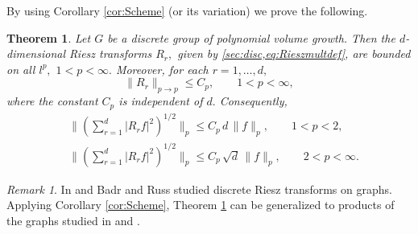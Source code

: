 \documentclass[leqno,12pt]{amsart}
\newtheorem{thm}{Theorem}[section]
\theoremstyle{definition}
\theoremstyle{remark}
\newtheorem*{remark}{Remark}
\begin{document}
By using Corollary \ref{cor:Scheme} (or its variation) we prove the following.
\begin{thm}
\label{thm:Rieszdiscgen}
Let $G$ be a discrete group of polynomial volume growth. Then the $d$-dimensional Riesz transforms $R_r,$ given by \eqref{sec:disc,eq:Rieszmultdef}, are bounded on all $l^p,$ $1<p<\infty.$ Moreover, for each $r=1,\ldots,d,$
\begin{equation}
\|R_r \|_{p\to p}\leq C_p ,\qquad 1<p<\infty,
\label{sec:disc,eq:Rieszdiscgen}
\end{equation}
where the constant $C_p$ is independent of $d.$ Consequently,
\begin{align}\label{sec:disc,eq:Rieszdiscgenvectp<2}
&\bigg\|\left(\sum_{r=1}^d|R_r f|^2\right)^{1/2}\bigg\|_{p}\leq C_p\, d\,\|f\|_{p},\qquad 1<p<2,\\
&\bigg\|\left(\sum_{r=1}^d|R_r f|^2\right)^{1/2}\bigg\|_{p}\leq C_p\, \sqrt{d}\, \|f\|_{p},\qquad 2<p<\infty. \label{sec:disc,eq:Rieszdiscgenvectp>2}
\end{align}
\end{thm}
\begin{remark}
In \cite{BaRus1} and \cite{Rus1} Badr and Russ studied discrete Riesz transforms on graphs. Applying Corollary \ref{cor:Scheme}, Theorem \ref{thm:Rieszdiscgen} can be generalized to products of the graphs studied in \cite{BaRus1} and \cite{Rus1}.
\end{remark}
\end{document}
